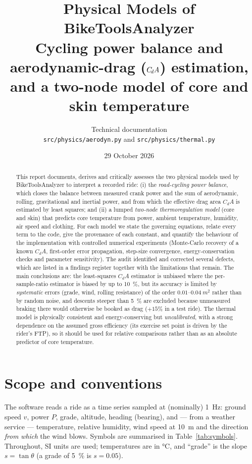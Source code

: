 \documentclass[11pt,a4paper]{article}
\title{\textbf{Physical Models of BikeToolsAnalyzer}\\[0.3em]
\large Cycling power balance and aerodynamic-drag (\(\CdA\)) estimation,\\
and a two-node model of core and skin temperature}
\author{Technical documentation\\[0.2em]\small\texttt{src/physics/aerodyn.py} and \texttt{src/physics/thermal.py}}
\date{29 October 2026}
\newcommand{\CdA}{C_{\!d}A}
\begin{document}
\maketitle

\begin{abstract}
\noindent
This report documents, derives and critically assesses the two physical models used by BikeToolsAnalyzer to interpret a recorded ride: (i) the \emph{road-cycling power balance}, which closes the balance between measured crank power and the sum of aerodynamic, rolling, gravitational and inertial power, and from which the effective drag area \(\CdA\) is estimated by least squares; and (ii) a lumped \emph{two-node thermoregulation model} (core and skin) that predicts core temperature from power, ambient temperature, humidity, air speed and clothing. For each model we state the governing equations, relate every term to the code, give the provenance of each constant, and quantify the behaviour of the implementation with controlled numerical experiments (Monte-Carlo recovery of a known \(\CdA\), first-order error propagation, step-size convergence, energy-conservation checks and parameter sensitivity). The audit identified and corrected several defects, which are listed in a findings register together with the limitations that remain. The main conclusions are: the least-squares \(\CdA\) estimator is unbiased where the per-sample-ratio estimator is biased by up to \SI{10}{\percent}, but its accuracy is limited by \emph{systematic} errors (grade, wind, rolling resistance) of the order \(0.01\)--\(0.04\ \si{m^2}\) rather than by random noise, and descents steeper than \SI{5}{\percent} are excluded because unmeasured braking there would otherwise be booked as drag (\(+15\%\) in a test ride). The thermal model is physically consistent and energy-conserving but \emph{uncalibrated}, with a strong dependence on the assumed gross efficiency (its exercise set point is driven by the rider's FTP), so it should be used for relative comparisons rather than as an absolute predictor of core temperature.
\end{abstract}

\tableofcontents
\newpage

\section{Scope and conventions}
The software reads a ride as a time series sampled at (nominally) \SI{1}{Hz}: ground speed \(v\), power \(P\), grade, altitude, heading (bearing), and --- from a weather service \citep{openmeteo} --- temperature, relative humidity, wind speed at \SI{10}{m} and the direction \emph{from which} the wind blows. Symbols are summarised in Table~\ref{tab:symbols}. Throughout, SI units are used; temperatures are in \si{\degreeCelsius}, and ``grade'' is the slope \(s=\tan\theta\) (a grade of \SI{5}{\percent} is \(s=0.05\)).
\end{document}
